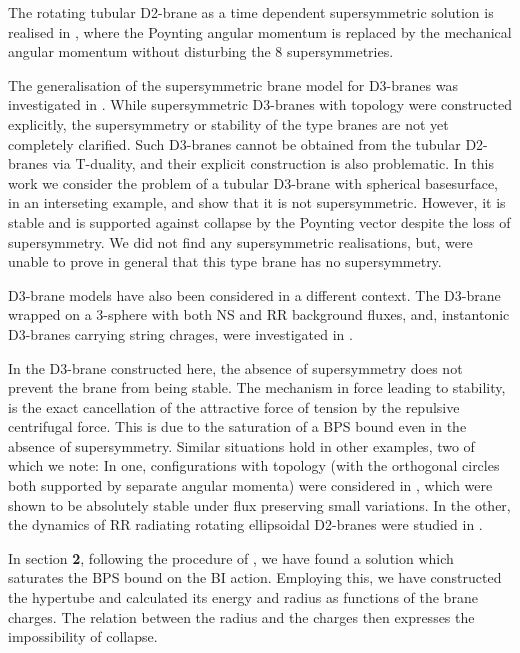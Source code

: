 \documentclass[a4paper,12pt]{article}
\begin{document}
The rotating tubular D2-brane as a time dependent supersymmetric solution is realised in \cite{rot}, where the Poynting angular momentum is replaced by the mechanical angular momentum without disturbing the 8 supersymmetries.
 
The generalisation of the supersymmetric brane model for D3-branes was investigated in \cite{dual, bak2, hel}. While supersymmetric D3-branes with \coordHE{} topology were constructed explicitly, the supersymmetry or stability of the \coordHE{} type branes are not yet completely clarified. Such D3-branes cannot be obtained from the tubular D2-branes via T-duality, and their explicit construction is also problematic\cite{hel, flux}. In this work we consider the problem of a tubular D3-brane with spherical basesurface, in an interseting example, and show that it is not supersymmetric. However, it is stable and is supported against collapse by the Poynting vector despite the loss of supersymmetry. We did not find any supersymmetric realisations, but, were unable to prove in general that this type brane has no supersymmetry.

D3-brane models have also been considered in a different context. The D3-brane wrapped on a 3-sphere with both NS and RR background fluxes, and, instantonic D3-branes carrying \coordHE{} string chrages, were investigated in \cite{evs2,evs}.

In the D3-brane constructed here, the absence of supersymmetry does not prevent the brane from being stable. The mechanism in force leading to stability, is the exact cancellation of the attractive force of tension by the repulsive centrifugal force. This is due to the saturation of a BPS bound even in the absence of supersymmetry. Similar situations hold in other examples, two of  which we note: In one, configurations with topology \coordHE{} (with the orthogonal circles both supported by separate angular momenta) were considered in \cite{per}, which were shown to be absolutely stable under flux preserving small variations. In the other, the dynamics of RR radiating rotating ellipsoidal D2-branes were studied in \cite{har}.

In section {\bf 2}, following the procedure of \cite{tub, emt, bak1, cts, hel, surp}, we have found a solution which saturates the BPS bound on the BI action.  Employing this, we have constructed the hypertube and calculated its energy and radius as functions of the brane charges. The relation between the radius and the charges then expresses the impossibility of collapse.
\end{document}

